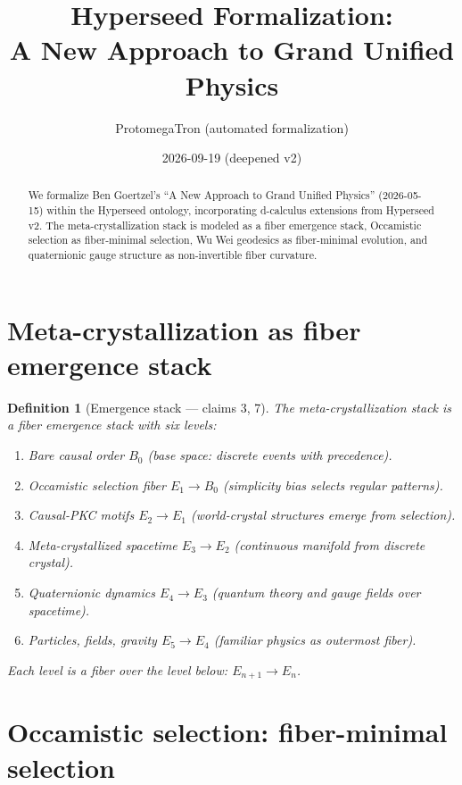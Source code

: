 \documentclass[11pt,a4paper]{article}
\title{Hyperseed Formalization:\\
  A New Approach to Grand Unified Physics}
\author{ProtomegaTron (automated formalization)}
\date{2026-09-19 (deepened v2)}
\newtheorem{definition}{Definition}[section]
\begin{document}
\maketitle

\begin{abstract}
We formalize Ben Goertzel's ``A New Approach to Grand Unified Physics''
(2026-05-15) within the Hyperseed ontology, incorporating d-calculus
extensions from Hyperseed v2. The meta-crystallization stack is modeled
as a fiber emergence stack, Occamistic selection as fiber-minimal
selection, Wu Wei geodesics as fiber-minimal evolution, and quaternionic
gauge structure as non-invertible fiber curvature.
\end{abstract}

\tableofcontents

\section{Meta-crystallization as fiber emergence stack}

\begin{definition}[Emergence stack --- claims 3, 7]
The meta-crystallization stack is a fiber emergence stack with six
levels:
\begin{enumerate}
  \item[0.] Bare causal order $B_0$ (base space: discrete events with
    precedence).
  \item[1.] Occamistic selection fiber $E_1 \to B_0$ (simplicity bias
    selects regular patterns).
  \item[2.] Causal-PKC motifs $E_2 \to E_1$ (world-crystal structures
    emerge from selection).
  \item[3.] Meta-crystallized spacetime $E_3 \to E_2$ (continuous
    manifold from discrete crystal).
  \item[4.] Quaternionic dynamics $E_4 \to E_3$ (quantum theory and
    gauge fields over spacetime).
  \item[5.] Particles, fields, gravity $E_5 \to E_4$ (familiar physics
    as outermost fiber).
\end{enumerate}
Each level is a fiber over the level below: $E_{n+1} \to E_n$.
\end{definition}

\section{Occamistic selection: fiber-minimal selection}
\end{document}

